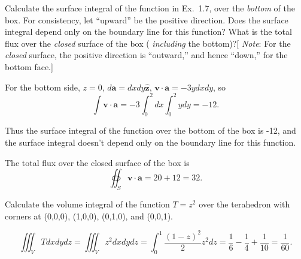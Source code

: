 \begin{prob}[1.30] Calculate the surface integral of the function in Ex.~1.7, over the \textit{bottom} of the box. For consistency, let ``upward'' be the positive direction. Does the surface integral depend only on the boundary line for this function? What is the total flux over the \textit{closed} surface of the box ( \textit{including} the bottom)?[ \textit{Note}: For the \textit{closed} surface, the positive direction is ``outward,'' and hence ``down,'' for the bottom face.]
\end{prob}

\begin{sol}[1.30] For the bottom side, $z = 0$, $d\mathbf{a} = dxdy\mathbf{\hat{z}}$, $\mathbf{v}\cdot\mathbf{a} = -3ydxdy$, so
    \begin{equation}
        \int\mathbf{v}\cdot\mathbf{a} = -3\int_0^2dx\int_0^2ydy = -12.
    \end{equation}

    Thus the surface integral of the function over the bottom of the box is -12, and the surface integral doesn't depend only on the boundary line for this function.

    The total flux over the closed surface of the box is
    \begin{equation}
        \oiint_S \mathbf{v}\cdot\mathbf{a} = 20 + 12 = 32.
    \end{equation}
\end{sol}

\begin{prob}[1.31] Calculate the volume integral of the function $T = z^2$ over the terahedron with corners at (0,0,0), (1,0,0), (0,1,0), and (0,0,1).
\end{prob}

\begin{sol}[1.31]
    \begin{equation}
        \iiint_V T dx dy dz = \iiint_V z^2 dx dy dz = \int_0^1\frac{(1-z)^2}{2}z^2dz = \frac{1}{6} - \frac{1}{4} + \frac{1}{10} = \frac{1}{60}.
    \end{equation}
\end{sol}
